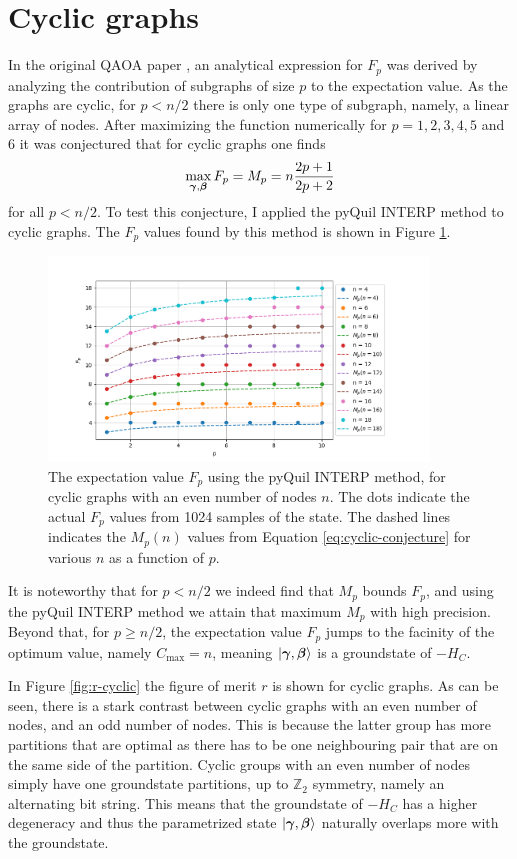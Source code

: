 \section{Cyclic graphs}
In the original QAOA paper \cite{FGG14}, an analytical expression for $F_p$ was derived by analyzing the contribution of subgraphs of size $p$ to the expectation value. As the graphs are cyclic, for $p<n/2$ there is only one type of subgraph, namely, a linear array of nodes. After maximizing the function numerically for $p=1,2,3,4,5$ and $6$ it was conjectured that for cyclic graphs one finds
\begin{equation}
\max_{\bm{\gamma},\bm{\beta}}F_p = M_p = n\frac{2p+1}{2p+2}
\label{eq:cyclic-conjecture}
\end{equation}
for all $p < n/2$. To test this conjecture, I applied the pyQuil INTERP method to cyclic graphs. The $F_p$ values found by this method is shown in Figure \ref{fig:cyclic-conjecture}.

\begin{figure}[H]
	\centering
	\includegraphics[width=0.9\textwidth]{figures/interp/cyclic_conjecture.png}
	\caption{The expectation value $F_p$ using the pyQuil INTERP method, for cyclic graphs with an even number of nodes $n$. The dots indicate the actual $F_p$ values from 1024 samples of the state. The dashed lines indicates the $M_p(n)$ values from Equation \eqref{eq:cyclic-conjecture} for various $n$ as a function of $p$.}
	\label{fig:cyclic-conjecture}
\end{figure}
It is noteworthy that for $p<n/2$ we indeed find that $M_p$ bounds $F_p$, and using the pyQuil INTERP method we attain that maximum $M_p$ with high precision. Beyond that, for $p \geq n/2$, the expectation value $F_p$ jumps to the facinity of the optimum value, namely $C_{\max} = n$, meaning $|\bm{\gamma},\bm{\beta}\rangle$ is a groundstate of $-H_C$. 

In Figure \ref{fig:r-cyclic} the figure of merit $r$ is shown for cyclic graphs. As can be seen, there is a stark contrast between cyclic graphs with an even number of nodes, and an odd number of nodes. This is because the latter group has more partitions that are optimal as there has to be one neighbouring pair that are on the same side of the partition. Cyclic groups with an even number of nodes simply have one groundstate partitions, up to $\mathbb{Z}_2$ symmetry, namely an alternating bit string. This means that the groundstate of $-H_C$ has a higher degeneracy and thus the parametrized state $|\bm{\gamma},\bm{\beta}\rangle$ naturally overlaps more with the groundstate.

